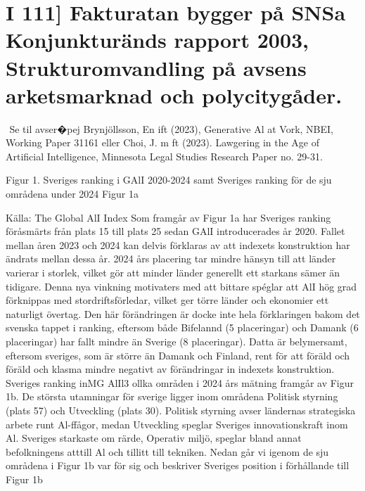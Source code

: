 {{{{{{{{{{{{{{{{\section*{I 111] Fakturatan bygger på SNSa Konjunkturänds rapport 2003, Strukturomvandling på avsens arketsmarknad och polycitygåder.}
\({ }^{}\) Se til avser�pej Brynjöllsson, En ift (2023), Generative Al at Vork, NBEI, Working Paper 31161 eller Choi, J. m ft (2023). Lawgering in the Age of Artificial Intelligence, Minnesota Legal Studies Research Paper no. 29-31.

Figur 1. Sveriges ranking i GAlI 2020-2024 samt Sveriges ranking för de sju områdena under 2024
Figur 1a

Källa: The Global AlI Index
Som framgår av Figur 1a har Sveriges ranking föråsmärts från plats 15 till plats 25 sedan GAlI introducerades år 2020. Fallet mellan åren 2023 och 2024 kan delvis förklaras av att indexets konstruktion har ändrats mellan dessa år. 2024 års placering tar mindre hänsyn till att länder varierar i storlek, vilket gör att minder länder generellt ett starkans sämer än tidigare. Denna nya vinkning motivaters med att bittare spéglar att AlI hög grad förknippas med stordriftsförledar, vilket ger törre länder och ekonomier ett naturligt övertag. Den här förändringen är docke inte hela förklaringen bakom det svenska tappet i ranking, eftersom både Bifelannd (5 placeringar) och Damank (6 placeringar) har fallt mindre än Sverige (8 placeringar). Datta är belymersamt, eftersom sveriges, som är större än Damank och Finland, rent för att föräld och föräld och klasma mindre negativt av förändringar in indexets konstruktion.
Sveriges ranking inMG AlIl3 ollka områden i 2024 års mätning framgår av Figur 1b. De största utamningar för sverige ligger inom områdena Politisk styrning (plats 57) och Utveckling (plats 30). Politisk styrning avser ländernas strategiska arbete runt Al-ffågor, medan Utveckling speglar Sveriges innovationskraft inom Al. Sveriges starkaste om rärde, Operativ miljö, speglar bland annat befolkningens atttill Al och tillitt till tekniken.
Nedan går vi igenom de sju områdena i Figur 1b var för sig och beskriver Sveriges position i förhållande till
Figur 1b

}}}}}}}}}}}}}}}}
